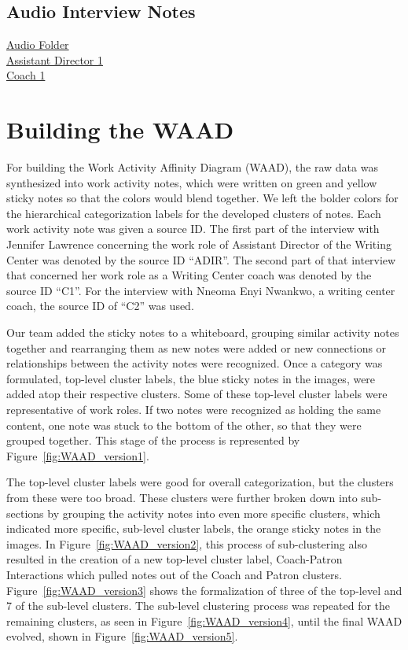 \documentclass[12pt]{article} %
\begin{document}
  \subsection*{Audio Interview Notes} %
  \href{http://www.dropbox.specialorange.com/vt/5714%20UX/}{Audio Folder}\\
    \href{http://www.dropbox.specialorange.com/vt/5714%20UX/ADir1.aac}{Assistant Director 1}\\
    \href{http://www.dropbox.specialorange.com/vt/5714%20UX/C1.aac}{Coach 1}\\

\section{Building the WAAD} %
  For building the Work Activity Affinity Diagram (WAAD), the raw data was synthesized into work activity notes, which were written on green and yellow sticky notes so that the colors would blend together.
  We left the bolder colors for the hierarchical categorization labels for the developed clusters of notes.  Each work activity note was given a source ID.
  The first part of the interview with Jennifer Lawrence concerning the work role of Assistant Director of the Writing Center was denoted by the source ID “ADIR”.
  The second part of that interview that concerned her work role as a Writing Center coach was denoted by the source ID “C1”.
  For the interview with Nneoma Enyi Nwankwo, a writing center coach, the source ID of “C2” was used. 

  Our team added the sticky notes to a whiteboard, grouping similar activity notes together and rearranging them as new notes were added or new connections or relationships between the activity notes were recognized.
  Once a category was formulated, top-level cluster labels, the blue sticky notes in the images, were added atop their respective clusters.
  Some of these top-level cluster labels were representative of work roles.
  If two notes were recognized as holding the same content, one note was stuck to the bottom of the other, so that they were grouped together.
  This stage of the process is represented by Figure~\ref{fig:WAAD_version1}. 

  The top-level cluster labels were good for overall categorization, but the clusters from these were too broad.
  These clusters were further broken down into sub-sections by grouping the activity notes into even more specific clusters, which indicated more specific, sub-level cluster labels, the orange sticky notes in the images.
  In Figure~\ref{fig:WAAD_version2}, this process of sub-clustering also resulted in the creation of a new top-level cluster label, Coach-Patron Interactions which pulled notes out of the Coach and Patron clusters.
  Figure~\ref{fig:WAAD_version3} shows the formalization of three of the top-level and 7 of the sub-level clusters.
  The sub-level clustering process was repeated for the remaining clusters, as seen in Figure~\ref{fig:WAAD_version4}, until the final WAAD evolved, shown in Figure~\ref{fig:WAAD_version5}.
\end{document}
